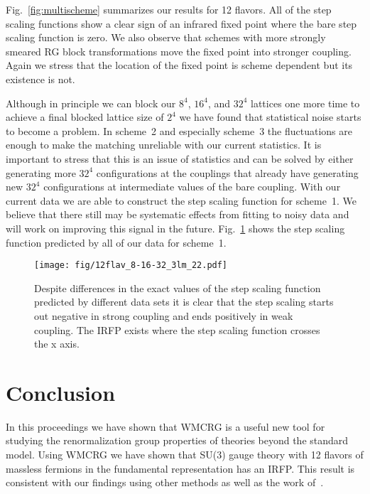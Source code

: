 \documentclass{PoS}
\newcommand{\fig}[1]{Fig.~\ref{#1}}
\newcommand{\TODO}[1]{\textcolor{red}{{\bf #1}}}
\begin{document}
\fig{fig:multischeme} summarizes our results for 12 flavors.
All of the step scaling functions show a clear sign of an infrared fixed point where the bare step scaling function is zero.
We also observe that schemes with more strongly smeared RG block transformations move the fixed point into stronger coupling.
Again we stress that the location of the fixed point is scheme dependent but its existence is not.

Although in principle we can block our $8^4$, $16^4$, and $32^4$ lattices one more time to achieve a final blocked lattice size of $2^4$ we have found that statistical noise starts to become a problem.
In scheme~2 and especially scheme~3 the fluctuations are enough to make the matching unreliable with our current statistics.
It is important to stress that this is an issue of statistics and can be solved by either generating more $32^4$ configurations at the couplings that already have generating new $32^4$ configurations at intermediate values of the bare coupling.
With our current data we are able to construct the step scaling function for scheme~1.
We believe that there still may be systematic effects from fitting to noisy data and will work on improving this signal in the future.
\fig{fig:scheme7} shows the step scaling function predicted by all of our data for scheme~1.

\begin{figure}[th]
  \centering
  \texttt{[image: fig/12flav\_8-16-32\_3lm\_22.pdf]}
  \caption{Despite differences in the exact values of the step scaling function predicted by different data sets it is clear that the step scaling starts out negative in strong coupling and ends positively in weak coupling.  The IRFP exists where the step scaling function crosses the x axis.}
  \label{fig:scheme7}
\end{figure}



\section{Conclusion}
In this proceedings we have shown that WMCRG is a useful new tool for studying the renormalization group properties of theories beyond the standard model.
Using WMCRG we have shown that SU(3) gauge theory with 12 flavors of massless fermions in the fundamental representation has an IRFP.
This result is consistent with our findings using other methods as well as the work of~\TODO{\cite{}}.
\end{document}

